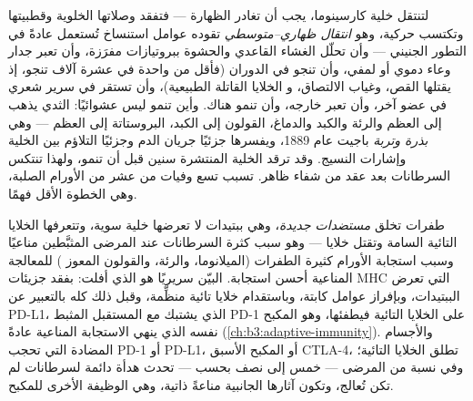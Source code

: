 \begin{definition}\label{def:b3:cancer-biology:metastasis}
لتنتقل خلية كارسينوما، يجب أن تغادر الظهارة --- فتفقد
وصلاتها الخلوية وقطبيتها وتكتسب حركية، وهو
\emph{انتقال ظهاري--متوسطي} تقوده عوامل استنساخ
تُستعمل عادةً في التطور الجنيني --- وأن تحلّل الغشاء
القاعدي والحشوة ببروتيازات مفرَزة، وأن تعبر جدار وعاء دموي
أو لمفي، وأن تنجو في الدوران (فأقل من واحدة في عشرة
آلاف تنجو، إذ يقتلها القص، وغياب الالتصاق، و
الخلايا القاتلة الطبيعية)، وأن تستقر في سرير شعري في عضو آخر، وأن تعبر
خارجه، وأن تنمو هناك. وأين تنمو ليس عشوائيًا:  الثدي يذهب إلى
العظم والرئة والكبد والدماغ،  القولون إلى الكبد،  البروستاتة
إلى العظم --- وهي \emph{بذرة وتربة} باجيت عام 1889، ويفسرها جزئيًا
جريان الدم وجزئيًا التلاؤم بين الخلية وإشارات
النسيج. وقد ترقد الخلية المنتشرة سنين قبل أن تنمو،
ولهذا تنتكس السرطانات بعد عقد من شفاء ظاهر. 
تسبب تسع وفيات من عشر من الأورام الصلبة، وهي الخطوة الأقل
فهمًا.
\end{definition}

\begin{proposition}\label{prop:b3:cancer-biology:immune}
طفرات  تخلق \emph{مستضدات جديدة}، وهي ببتيدات لا تعرضها
خلية سوية، وتتعرفها الخلايا التائية السامة وتقتل خلايا  --- وهو
سبب كثرة السرطانات عند المرضى المثبَّطين مناعيًا وسبب
استجابة الأورام كثيرة الطفرات (الميلانوما، والرئة، والقولون المعوز
) للمعالجة المناعية أحسن استجابة.  البيّن
سريريًا هو الذي أفلت: بفقد جزيئات MHC التي تعرض
الببتيدات، وبإفراز عوامل كابتة، وباستقدام خلايا تائية
منظِّمة، وقبل ذلك كله بالتعبير عن PD-L1، الذي يشتبك مع
المستقبل المثبط PD-1 على الخلايا التائية فيطفئها، وهو المكبح
نفسه الذي ينهي الاستجابة المناعية عادةً
(\cref{ch:b3:adaptive-immunity}). والأجسام المضادة التي تحجب PD-1 أو PD-L1،
أو المكبح الأسبق CTLA-4، تطلق الخلايا التائية؛ وفي نسبة من
المرضى --- خمس إلى نصف بحسب  --- تحدث
هدأة دائمة لسرطانات لم تكن تُعالج، وتكون آثارها
الجانبية مناعةً ذاتية، وهي الوظيفة الأخرى للمكبح.
\end{proposition}

